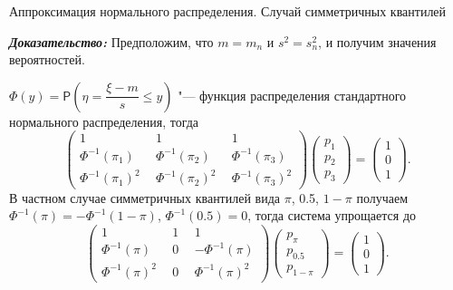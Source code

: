 \documentclass[ucs, notheorems, handout]{beamer}
\begin{document}
	\begin{frame}{Аппроксимация нормального распределения. Случай симметричных квантилей}
		
	\textbf{\textit{Доказательство:}}
		Предположим, что $m=m_{n}$ и $s^{2} = s_{n}^{2}$, и получим значения вероятностей.
		
		$\Phi (y) = \mathsf{P}(\eta = \dfrac{\xi-m}{s}\leq y)$ "--- функция распределения стандартного нормального распределения, тогда
		\begin{equation*}
			\begin{pmatrix} 1&1&1\\ 
				\Phi^{-1}(\pi_{1})~~ &  \Phi ^{-1}(\pi_{2})~~  & \Phi ^{-1}(\pi_{3}) \\ 
				\Phi ^{-1}(\pi_{1})^{2}~~&\Phi ^{-1}(\pi_{2})^{2}~~  &\Phi ^{-1}(\pi_{3})^{2}
			\end{pmatrix}
			\begin{pmatrix}p_{1}\\p_{2}\\ p_{3}\end{pmatrix}= \begin{pmatrix}1\\0\\1\end{pmatrix}. \label{8}
		\end{equation*}
		В частном случае симметричных квантилей вида $\pi$, 0.5, $1-\pi$ получаем $\Phi ^{-1}(\pi ) = -\Phi ^{-1}(1-\pi )$, $\Phi ^{-1}(0.5) = 0$, тогда система упрощается до
		\begin{equation*}
			\begin{pmatrix} 1&1&1\\ 
				\Phi^{-1}(\pi)~~ &  0~~  & -\Phi ^{-1}(\pi) \\ 
				\Phi ^{-1}(\pi)^{2}~~& 0~~  &\Phi ^{-1}(\pi)^{2}
			\end{pmatrix} 
			\begin{pmatrix}p_{\pi}\\p_{0.5}\\ p_{1-\pi}\end{pmatrix}= \begin{pmatrix}1\\0\\1\end{pmatrix}.
		\end{equation*}
		
	\end{frame}
\end{document}
